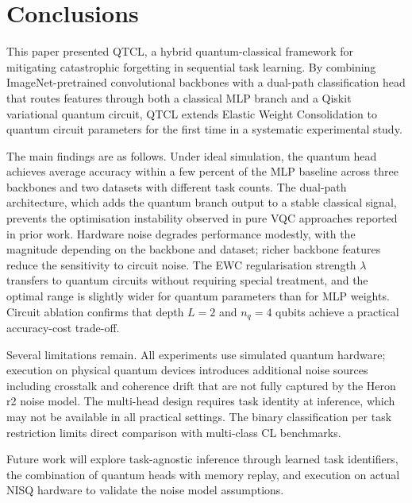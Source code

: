 \documentclass[acmlarge]{acmart}
\begin{document}
\section{Conclusions}
\label{sec:conclusions}

This paper presented QTCL, a hybrid quantum-classical framework for mitigating catastrophic forgetting in sequential task learning.
By combining ImageNet-pretrained convolutional backbones with a dual-path classification head that routes features through both a classical MLP branch and a Qiskit variational quantum circuit, QTCL extends Elastic Weight Consolidation to quantum circuit parameters for the first time in a systematic experimental study.

The main findings are as follows.
Under ideal simulation, the quantum head achieves average accuracy within a few percent of the MLP baseline across three backbones and two datasets with different task counts.
The dual-path architecture, which adds the quantum branch output to a stable classical signal, prevents the optimisation instability observed in pure VQC approaches reported in prior work.
Hardware noise degrades performance modestly, with the magnitude depending on the backbone and dataset; richer backbone features reduce the sensitivity to circuit noise.
The EWC regularisation strength $\lambda$ transfers to quantum circuits without requiring special treatment, and the optimal range is slightly wider for quantum parameters than for MLP weights.
Circuit ablation confirms that depth $L = 2$ and $n_q = 4$ qubits achieve a practical accuracy-cost trade-off.

Several limitations remain.
All experiments use simulated quantum hardware; execution on physical quantum devices introduces additional noise sources including crosstalk and coherence drift that are not fully captured by the Heron r2 noise model.
The multi-head design requires task identity at inference, which may not be available in all practical settings.
The binary classification per task restriction limits direct comparison with multi-class CL benchmarks.

Future work will explore task-agnostic inference through learned task identifiers, the combination of quantum heads with memory replay, and execution on actual NISQ hardware to validate the noise model assumptions.



\end{document}
